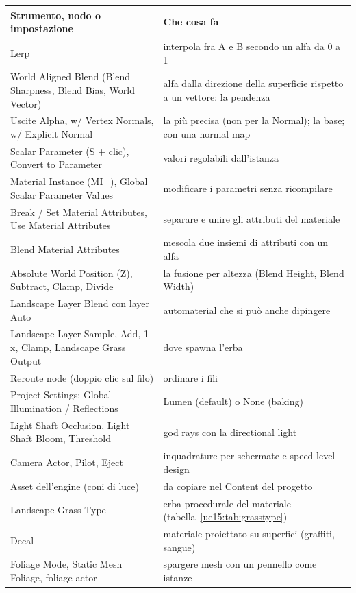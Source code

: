 \begin{table}[htbp]
\centering
\footnotesize
\begin{tabular}{@{}p{5.8cm}p{8.2cm}@{}}
\toprule
\textbf{Strumento, nodo o impostazione} & \textbf{Che cosa fa} \\
\midrule
Lerp & interpola fra A e B secondo un alfa da 0 a 1 \\
World Aligned Blend (Blend Sharpness, Blend Bias, World Vector) & alfa dalla direzione
della superficie rispetto a un vettore: la pendenza \\
Uscite Alpha, w/ Vertex Normals, w/ Explicit Normal & la più precisa (non per la Normal);
la base; con una normal map \\
Scalar Parameter (S + clic), Convert to Parameter & valori regolabili dall'istanza \\
Material Instance (MI\_), Global Scalar Parameter Values & modificare i parametri senza
ricompilare \\
Break / Set Material Attributes, Use Material Attributes & separare e unire gli attributi
del materiale \\
Blend Material Attributes & mescola due insiemi di attributi con un alfa \\
Absolute World Position (Z), Subtract, Clamp, Divide & la fusione per altezza (Blend
Height, Blend Width) \\
Landscape Layer Blend con layer Auto & automaterial che si può anche dipingere \\
Landscape Layer Sample, Add, 1-x, Clamp, Landscape Grass Output & dove spawna l'erba \\
Reroute node (doppio clic sul filo) & ordinare i fili \\
Project Settings: Global Illumination / Reflections & Lumen (default) o None (baking) \\
Light Shaft Occlusion, Light Shaft Bloom, Threshold & god rays con la directional light \\
Camera Actor, Pilot, Eject & inquadrature per schermate e speed level design \\
Asset dell'engine (coni di luce) & da copiare nel Content del progetto \\
Landscape Grass Type & erba procedurale del materiale (tabella~\ref{ue15:tab:grasstype}) \\
Decal & materiale proiettato su superfici (graffiti, sangue) \\
Foliage Mode, Static Mesh Foliage, foliage actor & spargere mesh con un pennello come
istanze \\

\end{tabular}
\end{table}
